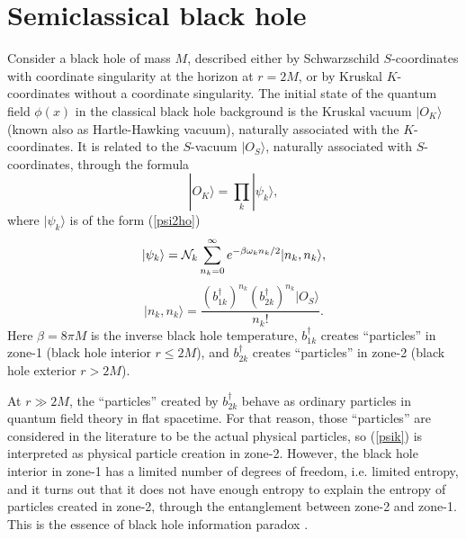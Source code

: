 \documentclass[12pt]{article}
\begin{document}
\section{Semiclassical black hole}

Consider a black hole of mass $M$, described either by Schwarzschild $S$-coordinates
with coordinate singularity at the horizon at $r=2M$, or by Kruskal $K$-coordinates without a coordinate singularity.
The initial state of the quantum field $\phi(x)$ in the 
classical black hole background is the Kruskal vacuum $|O_K\rangle$ \cite{bd} (known also as Hartle-Hawking vacuum),
naturally associated with the $K$-coordinates. It is related to the $S$-vacuum $|O_S\rangle$, naturally associated 
with $S$-coordinates, through the formula \cite{bd}
\begin{equation}\label{0_K}
 |O_K\rangle = \prod_k |\psi_k\rangle ,
\end{equation}
where $|\psi_k\rangle$ is of the form (\ref{psi2ho})
\begin{equation}\label{psik}
 |\psi_k\rangle = {\cal N}_k\sum_{n_k=0}^{\infty} e^{-\beta\omega_k n_k/2} |n_k,n_k\rangle ,
\end{equation}
\begin{equation}
 |n_k,n_k\rangle = \frac{ (b_{1k}^\dagger)^{n_k}  (b_{2k}^\dagger)^{n_k}  |O_S\rangle}{n_k!} .
\end{equation}
Here $\beta=8\pi M$ is the inverse black hole temperature, $b_{1k}^\dagger$ creates ``particles''
in zone-1 (black hole interior $r\leq 2M$), and $b_{2k}^\dagger$ creates ``particles''
in zone-2 (black hole exterior $r> 2M$). 

At $r\gg 2M$, the ``particles'' created by $b_{2k}^\dagger$ behave as ordinary particles in quantum field theory in flat spacetime.
For that reason, those ``particles'' are considered in the literature to be the actual physical particles, 
so (\ref{psik}) is interpreted
as physical particle creation in zone-2. However, the black hole interior in zone-1 has a limited number of degrees of freedom,
i.e. limited entropy, and it turns out that it does not have enough entropy to explain the entropy of particles created in zone-2,
through the entanglement between zone-2 and zone-1. This is the essence of black hole information paradox 
\cite{gid,math1,math2,hoss,dundar,harlow,polchinski,chakra,marolf,fabbri}.
\end{document}
